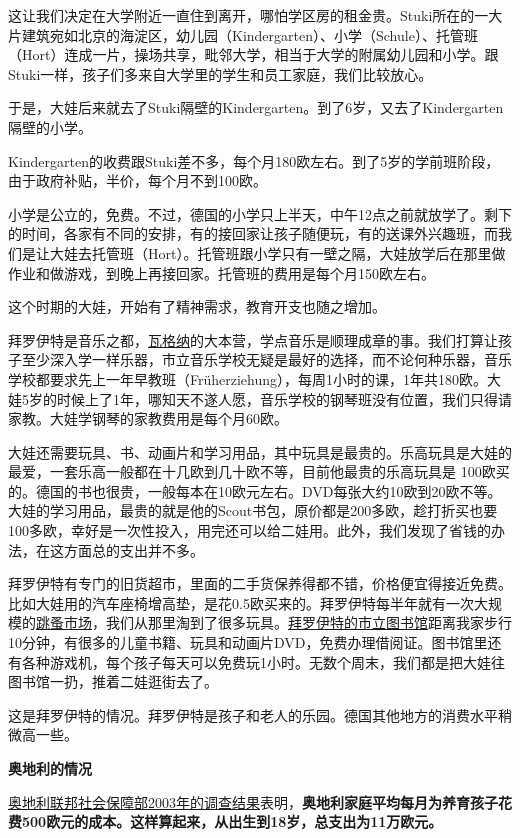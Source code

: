 \documentclass[twoside,openright,headings=optiontohead]{ctexbook} %
\begin{document}
{这让我们决定在大学附近一直住到离开，哪怕学区房的租金贵。Stuki所在的一大片建筑宛如北京的海淀区，幼儿园（Kindergarten）、小学（Schule）、托管班（Hort）连成一片，操场共享，毗邻大学，相当于大学的附属幼儿园和小学。跟Stuki一样，孩子们多来自大学里的学生和员工家庭，我们比较放心。

于是，大娃后来就去了Stuki隔壁的Kindergarten。到了6岁，又去了Kindergarten隔壁的小学。

Kindergarten的收费跟Stuki差不多，每个月180欧左右。到了5岁的学前班阶段，由于政府补贴，半价，每个月不到100欧。

小学是公立的，免费。不过，德国的小学只上半天，中午12点之前就放学了。剩下的时间，各家有不同的安排，有的接回家让孩子随便玩，有的送课外兴趣班，而我们是让大娃去托管班（Hort）。托管班跟小学只有一壁之隔，大娃放学后在那里做作业和做游戏，到晚上再接回家。托管班的费用是每个月150欧左右。

这个时期的大娃，开始有了精神需求，教育开支也随之增加。

拜罗伊特是音乐之都，\href{http://dapengde.com/archives/15341}{瓦格纳}的大本营，学点音乐是顺理成章的事。我们打算让孩子至少深入学一样乐器，市立音乐学校无疑是最好的选择，而不论何种乐器，音乐学校都要求先上一年早教班（Früherziehung），每周1小时的课，1年共180欧。大娃5岁的时候上了1年，哪知天不遂人愿，音乐学校的钢琴班没有位置，我们只得请家教。大娃学钢琴的家教费用是每个月60欧。

大娃还需要玩具、书、动画片和学习用品，其中玩具是最贵的。乐高玩具是大娃的最爱，一套乐高一般都在十几欧到几十欧不等，目前他最贵的乐高玩具是
100欧买的。德国的书也很贵，一般每本在10欧元左右。DVD每张大约10欧到20欧不等。大娃的学习用品，最贵的就是他的Scout书包，原价都是200多欧，趁打折买也要100多欧，幸好是一次性投入，用完还可以给二娃用。此外，我们发现了省钱的办法，在这方面总的支出并不多。

拜罗伊特有专门的旧货超市，里面的二手货保养得都不错，价格便宜得接近免费。比如大娃用的汽车座椅增高垫，是花0.5欧买来的。拜罗伊特每半年就有一次大规模的\href{http://dapengde.com/archives/10902}{跳蚤市场}，我们从那里淘到了很多玩具。\href{http://dapengde.com/archives/15791}{拜罗伊特的市立图书馆}距离我家步行10分钟，有很多的儿童书籍、玩具和动画片DVD，免费办理借阅证。图书馆里还有各种游戏机，每个孩子每天可以免费玩1小时。无数个周末，我们都是把大娃往图书馆一扔，推着二娃逛街去了。

这是拜罗伊特的情况。拜罗伊特是孩子和老人的乐园。德国其他地方的消费水平稍微高一些。

\textbf{奥地利的情况}

\href{http://www.kindertipps-wien.at/was-kostet-ein-kind-bis-zum-18-lebensjahr/}{奥地利联邦社会保障部2003年的调查结果}表明，\textbf{奥地利家庭平均每月为养育孩子花费500欧元的成本。这样算起来，从出生到18岁，总支出为11万欧元。}

}
\end{document}
